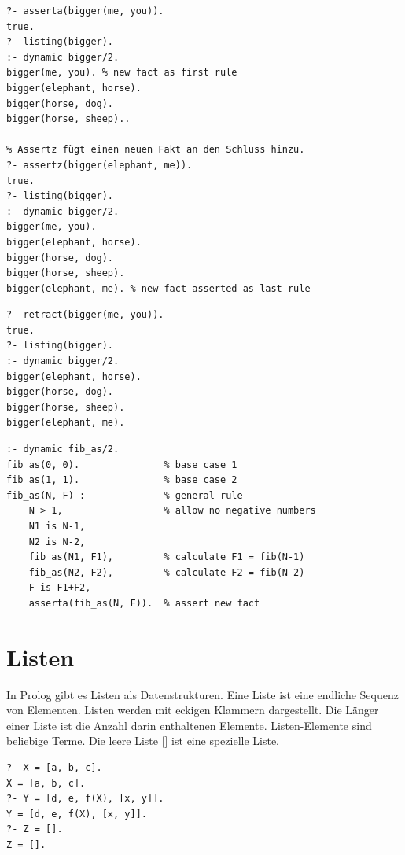 \begin{lstlisting}[caption=asserta/1 \& assertz/1]
% Asserta fügt einen neuen Fakt an den Beginn hinzu.
?- asserta(bigger(me, you)).
true.
?- listing(bigger).
:- dynamic bigger/2.
bigger(me, you). % new fact as first rule
bigger(elephant, horse).
bigger(horse, dog).
bigger(horse, sheep)..

% Assertz fügt einen neuen Fakt an den Schluss hinzu.
?- assertz(bigger(elephant, me)).
true.
?- listing(bigger).
:- dynamic bigger/2.
bigger(me, you).
bigger(elephant, horse).
bigger(horse, dog).
bigger(horse, sheep).
bigger(elephant, me). % new fact asserted as last rule
\end{lstlisting}

\begin{lstlisting}[caption=retract/1]
% Mittels retract können Fakten/Regeln entfernt werden.
?- retract(bigger(me, you)).
true.
?- listing(bigger).
:- dynamic bigger/2.
bigger(elephant, horse).
bigger(horse, dog).
bigger(horse, sheep).
bigger(elephant, me).
\end{lstlisting}

\newpage
\begin{lstlisting}[caption=Naive Fibonnaci optimiert mit Assertions]
% Nach jeder Berechnung einer Fibonacci Zahl wird diese in die Wissensdatenbank an den Anfang (wichtig) gespeichert. Diese müssen nun nicht mehr neu berechnet werden.
:- dynamic fib_as/2.
fib_as(0, 0). 				% base case 1
fib_as(1, 1). 				% base case 2
fib_as(N, F) :- 			% general rule
	N > 1, 					% allow no negative numbers
	N1 is N-1, 
	N2 is N-2,
	fib_as(N1, F1), 		% calculate F1 = fib(N-1)
	fib_as(N2, F2), 		% calculate F2 = fib(N-2)
	F is F1+F2,
	asserta(fib_as(N, F)). 	% assert new fact
\end{lstlisting}

\section{Listen}
In Prolog gibt es Listen als Datenstrukturen. Eine Liste ist eine endliche Sequenz von Elementen. Listen werden mit eckigen Klammern dargestellt. Die Länger einer Liste ist die Anzahl darin enthaltenen Elemente. Listen-Elemente sind beliebige Terme. Die leere Liste [] ist eine spezielle Liste.

\begin{lstlisting}[caption=Listen in Prolog]
?- X = [a, b, c].
X = [a, b, c].
?- Y = [d, e, f(X), [x, y]].
Y = [d, e, f(X), [x, y]].
?- Z = [].
Z = [].
\end{lstlisting}

